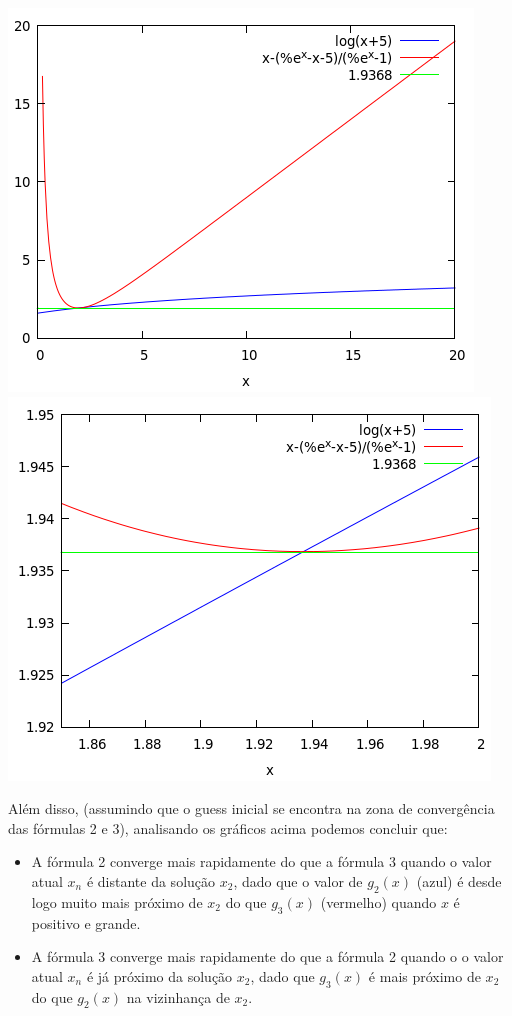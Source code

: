 \documentclass{mnum}
\begin{document}
\begin{center} 
\includegraphics[scale=0.45]{2017E_3_3_02}
\includegraphics[scale=0.45]{2017E_3_3_03}
\end{center}
Além disso, (assumindo que o guess inicial se encontra na zona de convergência das fórmulas 2 e 3), analisando os gráficos acima podemos concluir que:
\begin{itemize}
    \item A fórmula 2 converge mais rapidamente do que a fórmula 3 quando o valor atual $x_n$ é distante da solução $x_2$, dado que o valor de $g_2(x)$ (azul) é desde logo muito mais próximo de $x_2$ do que $g_3(x)$ (vermelho) quando $x$ é positivo e grande.
    \item A fórmula 3 converge mais rapidamente do que a fórmula 2 quando o o valor atual $x_n$ é já próximo da solução $x_2$, dado que $g_3(x)$ é mais próximo de $x_2$ do que $g_2(x)$ na vizinhança de $x_2$.
\end{itemize}
\end{document}
